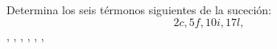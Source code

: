 
\question Determina los seis térmonos siguientes de la suceción:
\[
  2c, 5f, 10i, 17l,
\]
  \fillin[26o], \fillin[37r], \fillin[50u], \fillin[65x],
  \fillin[82a], \fillin[101d], 
